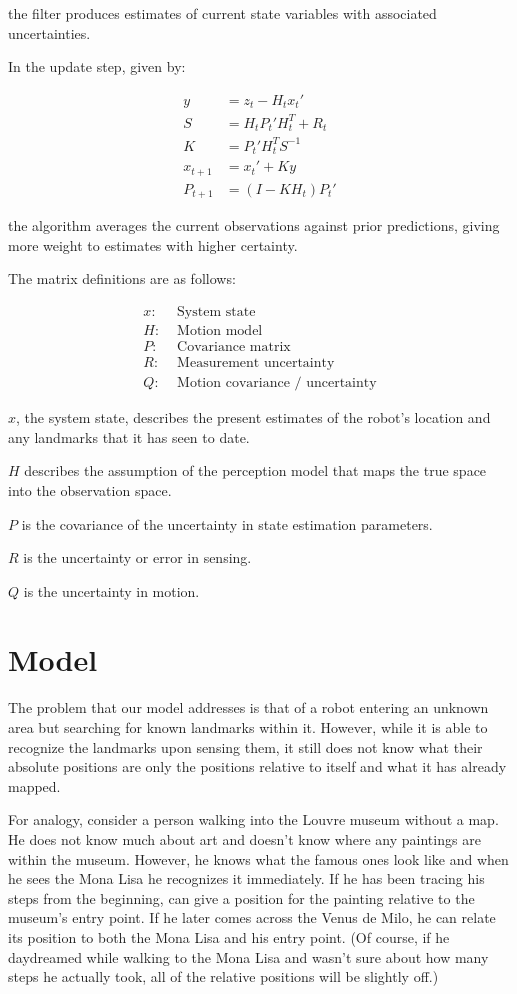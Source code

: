 \documentclass[prodmode,acmtecs]{acmsmall} %
\begin{document}
the filter produces estimates of current state variables with associated uncertainties.

In the update step, given by:

\begin{align*}
    y &= z_t - H_t x_t' \\
    S &= H_t P_t' H^T_t + R_t \\
    K &= P_t' H^T_t S^{-1} \\
    x_{t+1} &= x_t' + Ky \\
    P_{t+1} &= (I - K H_t) P_t'
\end{align*}

the algorithm averages the current observations against prior predictions, giving more weight to estimates with higher certainty.

The matrix definitions are as follows:

\begin{align*}
    x:& \text{ System state}\\
    H:& \text{ Motion model}\\
    P:& \text{ Covariance matrix}\\
    R:& \text{ Measurement uncertainty}\\
    Q:& \text{ Motion covariance / uncertainty}
\end{align*}

$x$, the system state, describes the present estimates of the robot's location and any landmarks that it has seen to date.

$H$ describes the assumption of the perception model that maps the true space into the observation space.

$P$ is the covariance of the uncertainty in state estimation parameters.

$R$ is the uncertainty or error in sensing.

$Q$ is the uncertainty in motion.

\section{Model}

The problem that our model addresses is that of a robot entering an unknown area but searching for known landmarks within it.  However, while it is able to recognize the landmarks upon sensing them, it still does not know what their absolute positions are \- only the positions relative to itself and what it has already mapped.

For analogy, consider a person walking into the Louvre museum without a map.  He does not know much about art and doesn't know where any paintings are within the museum.  However, he knows what the famous ones look like and when he sees the Mona Lisa he recognizes it immediately. If he has been tracing his steps from the beginning, can give a position for the painting relative to the museum's entry point.  If he later comes across the Venus de Milo, he can relate its position to both the Mona Lisa and his entry point.  (Of course, if he daydreamed while walking to the Mona Lisa and wasn't sure about how many steps he actually took, all of the relative positions will be slightly off.)
\end{document}
